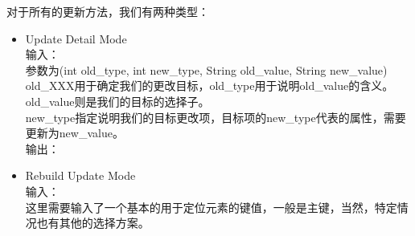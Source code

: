 \documentclass[../report.tex]{subfiles}
\begin{document}
\begin{enumerate}
对于所有的更新方法，我们有两种类型：
\begin{itemize}
\item 
Update Detail Mode\\
输入：\\
参数为(int old\_type, int new\_type, String old\_value, String new\_value)\\
old\_XXX用于确定我们的更改目标，old\_type用于说明old\_value的含义。old\_value则是我们的目标的选择子。\\
new\_type指定说明我们的目标更改项，目标项的new\_type代表的属性，需要更新为new\_value。\\
输出：
\item 
Rebuild Update Mode\\
输入：\\
这里需要输入了一个基本的用于定位元素的键值，一般是主键，当然，特定情况也有其他的选择方案。
\end{itemize}

\end{enumerate}
\end{document}
